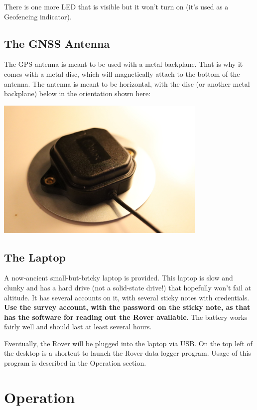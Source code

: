 \documentclass[usletter]{article}
\begin{document}
There is one more LED that is visible but it won't turn on (it's used as a Geofencing indicator). 

\subsection{The GNSS Antenna} 

The GPS antenna is meant to be used with a metal backplane. That is why it comes with a metal disc, which will magnetically attach to the bottom of the antenna. The antenna is meant to be horizontal, with the disc (or another metal backplane) below in the orientation shown here: 

\begin{center} 
\includegraphics[width=4in]{gps-antenna} 
\end{center}

\subsection{The Laptop} 

A now-ancient small-but-bricky laptop is provided. This laptop is slow and clunky and has a hard drive (not a solid-state drive!) that hopefully won't fail at altitude. It has several accounts on it, with several sticky notes with credentials. \textbf{Use the survey account, with the password on the sticky note, as that has the software for reading out the Rover available}. The battery works fairly well and should last at least several hours. 

Eventually, the Rover will be plugged into the laptop via USB. On the top left of the desktop is a shortcut to launch the Rover data logger program. Usage of this program is described in the Operation section. 

\section{Operation} 
\end{document}
